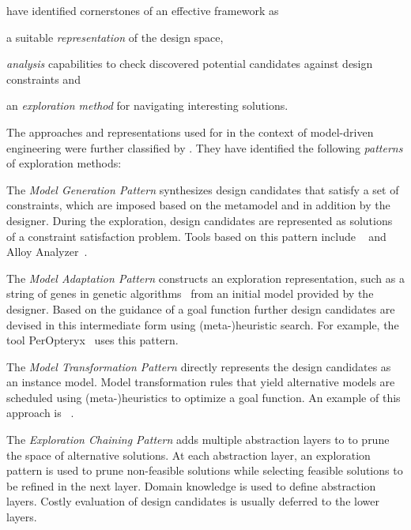 \citet{Kang10effective} have identified cornerstones of an effective  framework as
\begin{inparaenum}
\item a suitable \emph{representation} of the design space,
\item \emph{analysis} capabilities to check discovered potential candidates against design constraints and
\item an \emph{exploration method} for navigating interesting solutions.
\end{inparaenum}
The approaches and representations used for  in the context of model-driven engineering were further classified by \citet{Vanherpen14patterns}. They have identified the following \emph{ patterns} of exploration methods:
\begin{itemize*}
\item The \emph{Model Generation Pattern} synthesizes design candidates that satisfy a set of constraints, which are imposed based on the metamodel and in addition by the designer. During the exploration, design candidates are represented as solutions of a constraint satisfaction problem. Tools based on this pattern include ~\citep{Kang10effective} and Alloy Analyzer~\citep{Jackson11abstractions}.
\item The \emph{Model Adaptation Pattern} constructs an exploration representation, such as a string of genes in genetic algorithms~ from an initial model provided by the designer. Based on the guidance of a goal function further design candidates are devised in this intermediate form using (meta-)heuristic search. For example, the  tool PerOpteryx~\citep{Martens10evolutionary} uses this pattern.
\item The \emph{Model Transformation Pattern} directly represents the design candidates as an instance model. Model transformation rules that yield alternative models are scheduled using (meta-)heuristics to optimize a goal function. An example of this approach is ~\citep{Hegedus13guided,Abdeen14multiobjective}.
\item The \emph{Exploration Chaining Pattern} adds multiple abstraction layers to  to prune the space of alternative solutions. At each abstraction layer, an exploration pattern is used to prune non-feasible solutions while selecting feasible solutions to be refined in the next layer. Domain knowledge is used to define abstraction layers. Costly evaluation of design candidates is usually deferred to the lower layers.
\end{itemize*}

